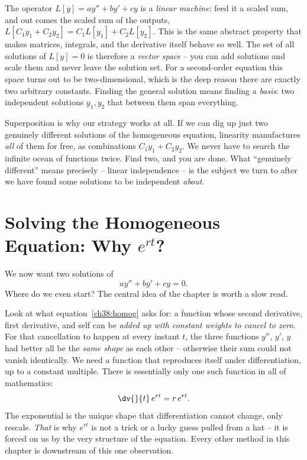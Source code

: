 \begin{happeningbox}
The operator $L[y] = a y'' + b y' + c y$ is a \emph{linear machine}: feed it a
scaled sum, and out comes the scaled sum of the outputs, $L[C_1 y_1 + C_2 y_2] =
C_1 L[y_1] + C_2 L[y_2]$. This is the same abstract property that makes matrices,
integrals, and the derivative itself behave so well. The set of all solutions of
$L[y] = 0$ is therefore a \emph{vector space} -- you can add solutions and scale
them and never leave the solution set. For a second-order equation this space
turns out to be two-dimensional, which is the deep reason there are exactly two
arbitrary constants. Finding the general solution means finding a \emph{basis}:
two independent solutions $y_1, y_2$ that between them span everything.
\end{happeningbox}

\begin{whybox}
Superposition is why our strategy works at all. If we can dig up just two
genuinely different solutions of the homogeneous equation, linearity manufactures
\emph{all} of them for free, as combinations $C_1 y_1 + C_2 y_2$. We never have
to search the infinite ocean of functions twice. Find two, and you are done.
What ``genuinely different'' means precisely -- linear independence -- is the
subject we turn to after we have found some solutions to be independent
\emph{about}.
\end{whybox}

\section{Solving the Homogeneous Equation: Why $e^{rt}$?}
\label{ch38:characteristic}

We now want two solutions of
\begin{equation}
  a y'' + b y' + c y = 0.
  \label{ch38:homog}
\end{equation}
Where do we even start? The central idea of the chapter is worth a slow read.

\begin{happeningbox}
Look at what equation~\eqref{ch38:homog} asks for: a function whose second
derivative, first derivative, and self can be \emph{added up with constant weights
to cancel to zero}. For that cancellation to happen at every instant $t$, the
three functions $y''$, $y'$, $y$ had better all be the \emph{same shape} as each
other -- otherwise their sum could not vanish identically. We need a function
that reproduces itself under differentiation, up to a constant multiple. There is
essentially only one such function in all of mathematics:
\[
  \dv{}{t}\, e^{rt} = r\, e^{rt}.
\]
The exponential is the unique shape that differentiation cannot change, only
rescale. \emph{That} is why $e^{rt}$ is not a trick or a lucky guess pulled from
a hat -- it is forced on us by the very structure of the equation. Every other
method in this chapter is downstream of this one observation.
\end{happeningbox}

